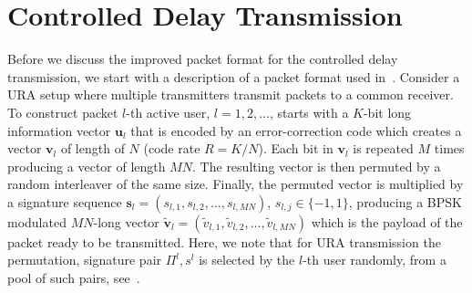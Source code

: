 \documentclass[journal,onecolumn,12pt]{IEEEtran}
\begin{document}


\iffalse
\section{Controlled Delay Transmission}
\label{sec:CD}

Before we discuss the improved packet format for the controlled delay transmission, we start with a description of a packet format used in~\cite{TBKN20}. Consider a URA setup where multiple transmitters transmit packets to a common receiver. To construct packet $l$-th active user, $l=1,2,\ldots$, starts with a $K$-bit long information vector $\boldsymbol{u}_l$ that is encoded by an error-correction code which creates a vector $\boldsymbol{v}_l$ of length of $N$ (code rate $R=K/N$). Each bit in $\boldsymbol{v}_l$ is repeated $M$ times producing a vector of length $MN$. The resulting vector is then permuted by a random interleaver of the same size. Finally, the permuted vector is multiplied by a signature sequence $\boldsymbol{s}_l = \left(s_{l,1},s_{l,2},\ldots,s_{l,MN}\right)$, $s_{l,j} \in \{-1,1 \}$, producing a BPSK modulated $MN$-long vector $\tilde{\boldsymbol{v}}_l=\left(\tilde{v}_{l,1},\tilde{v}_{l,2},\ldots,\tilde{v}_{l,MN}\right)$ which is the payload of the packet ready to be transmitted. Here, we note that for URA transmission the permutation, signature pair $\Pi^l,s^l$ is selected by the $l$-th user randomly, from a pool of such pairs, see~\cite{TBKN20}.
\end{document}
